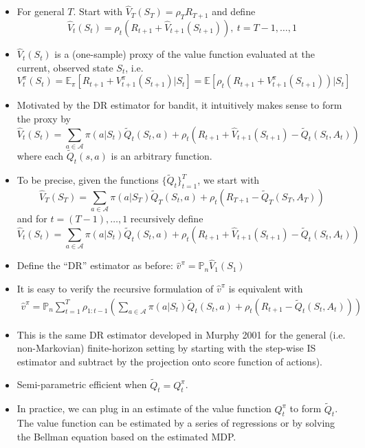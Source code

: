 \documentclass[11pt]{article}
\def\EE{\mathbb{E}}
\def\Pn{\mathbb{P}_n}
\def\A{\mathcal{A}}
\begin{document}
\begin{itemize}
\item For general $T$. Start with $\hat V_T (S_T) = \rho_{T} R_{T+1}$ and define 
  \[
    \hat V_t(S_t) = \rho_t(R_{t+1} + \hat V_{t+1}(S_{t+1})), ~t = T-1, \dots, 1
  \]
\item $\hat V_t(S_t)$ is a (one-sample) proxy of the value function evaluated at the current, observed state $S_t$, i.e. $$V_t^\pi(S_t) = \EE_\pi[R_{t+1}+V_{t+1}^\pi(S_{t+1})|S_t] = \EE[\rho_t (R_{t+1}+V_{t+1}^\pi(S_{t+1}))|S_t]$$ 
  
\item Motivated by the DR estimator for bandit, it intuitively makes sense to form the proxy by
  \[
    \hat V_t(S_t) = \sum_{a \in \A} \pi(a|S_t) \tilde Q_t(S_t, a) + \rho_t(R_{t+1} + \hat V_{t+1}(S_{t+1})-\tilde Q_t(S_t, A_t))
  \]
  where each $\tilde Q_t(s, a)$ is an arbitrary function.

\item To be precise, given the functions $\{\tilde Q_t\}_{t=1}^T$, we start with 
  \[
    \hat V_T(S_T) = \sum_{a \in \A} \pi(a|S_T) \tilde Q_T(S_t, a) + \rho_t(R_{T+1} -\tilde Q_T(S_T, A_T))
  \]
  and for $t = (T-1), \dots, 1$ recursively define 
  \[
    \hat V_t(S_t) = \sum_{a \in \A} \pi(a|S_t) \tilde Q_t(S_t, a) + \rho_t(R_{t+1} + \hat V_{t+1}(S_{t+1})-\tilde Q_t(S_t, A_t))
  \]
\item Define the ``DR'' estimator as before: $\hat v^\pi = \Pn \hat V_1(S_1)$
  
\item It is easy to verify the recursive formulation of $\hat v^\pi$ is equivalent with 
  \begin{align*}
    \hat v^\pi = \Pn \sum_{t=1}^{T} \rho_{1:t-1} \left(\sum_{a \in \A} \pi(a|S_t) \tilde Q_t(S_t, a) + \rho_t(R_{t+1} -\tilde Q_t(S_t, A_t))\right)
  \end{align*}
  
\item This is the same DR estimator developed in Murphy 2001 for the general (i.e. non-Markovian) finite-horizon setting by starting with the step-wise IS estimator and subtract by the projection onto score function of actions).
  
\item Semi-parametric efficient when $\tilde Q_t = Q^\pi_t$.
  
\item In practice, we can plug in an estimate of the value function $Q^\pi_t$ to form $\tilde Q_t$. The value function can be estimated by a series of regressions or by solving the Bellman equation based on the estimated MDP.
\end{itemize}
\end{document}
